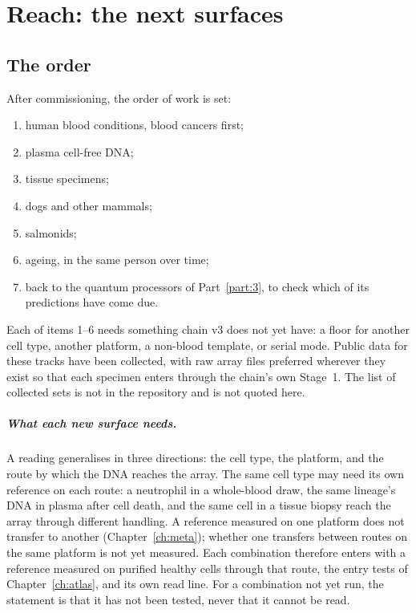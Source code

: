 \chapter{Reach: the next surfaces}\label{part4:ch:reach}

\section{The order}

After commissioning, the order of work is set:
\begin{enumerate}
\item human blood conditions, blood cancers first;
\item plasma cell-free DNA;
\item tissue specimens;
\item dogs and other mammals;
\item salmonids;
\item ageing, in the same person over time;
\item back to the quantum processors of Part~\ref{part:3}, to check which of its predictions have come due.
\end{enumerate}
Each of items 1--6 needs something chain v3 does not yet have: a floor for another cell type, another platform, a non-blood template, or serial mode.
Public data for these tracks have been collected, with raw array files preferred wherever they exist so that each specimen enters through the chain's own
Stage~1. The list of collected sets is not in the repository and is not quoted here. \openprob

\paragraph{What each new surface needs.} A reading generalises in three directions: the cell type, the platform, and the route by which
the DNA reaches the array. The same cell type may need its own reference on each route: a neutrophil in a whole-blood draw, the same
lineage's DNA in plasma after cell death, and the same cell in a tissue biopsy reach the array through different handling. A reference
measured on one platform does not transfer to another (Chapter~\ref{ch:meta}); whether one transfers between routes on the same
platform is not yet measured. \openprob{} Each combination therefore enters with a reference measured on purified healthy cells through
that route, the entry tests of Chapter~\ref{ch:atlas}, and its own read line. For a combination not yet run, the statement is that it
has not been tested, never that it cannot be read.

